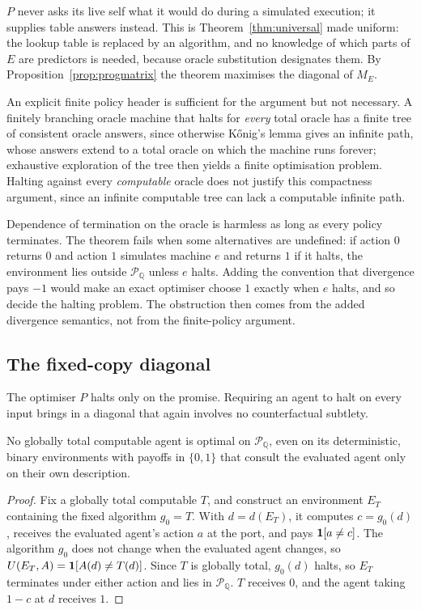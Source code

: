 $P$ never asks its live self what it would do during a simulated execution; it supplies table
answers instead. This is Theorem~\ref{thm:universal} made uniform: the lookup table is replaced by
an algorithm, and no knowledge of which parts of $E$ are predictors is needed, because oracle
substitution designates them. By Proposition~\ref{prop:progmatrix} the theorem maximises the
diagonal of $M_E$.

An explicit finite policy header is sufficient for the argument but not necessary. A finitely
branching oracle machine that halts for \emph{every} total oracle has a finite tree of consistent
oracle answers, since otherwise Kőnig's lemma \autocite{konig1927} gives an infinite path, whose
answers extend to a total oracle on which the machine runs forever; exhaustive exploration of the
tree then yields a finite optimisation problem. Halting against every \emph{computable} oracle does
not justify this compactness argument, since an infinite computable tree can lack a computable
infinite path.

Dependence of termination on the oracle is harmless as long as every policy terminates. The theorem
fails when some alternatives are undefined: if action $0$ returns $0$ and action $1$ simulates
machine $e$ and returns $1$ if it halts, the environment lies outside $\mathcal P_{\mathbb Q}$ unless
$e$ halts. Adding the convention that divergence pays $-1$ would make an exact optimiser choose $1$
exactly when $e$ halts, and so decide the halting problem. The obstruction then comes from the
added divergence semantics, not from the finite-policy argument.

\subsection{The fixed-copy diagonal}

The optimiser $P$ halts only on the promise. Requiring an agent to halt on every input brings in a
diagonal that again involves no counterfactual subtlety.

\begin{theorem}\label{thm:fixedcopy}
No globally total computable agent is optimal on $\mathcal P_{\mathbb Q}$, even on its deterministic,
binary environments with payoffs in $\{0,1\}$ that consult the evaluated agent only on their own
description.
\end{theorem}

\begin{proof}
Fix a globally total computable $T$, and construct an environment $E_T$ containing the fixed algorithm
$g_0=T$. With $d=d(E_T)$, it computes $c=g_0(d)$, receives the evaluated agent's action $a$ at the
port, and pays $\mathbf{1}[a\neq c]$. The algorithm $g_0$ does not change when the evaluated agent changes,
so $U(E_T,A)=\mathbf{1}[A(d)\ne T(d)]$. Since $T$ is globally total, $g_0(d)$ halts, so $E_T$ terminates
under either action and lies in $\mathcal P_{\mathbb Q}$. $T$ receives $0$, and the agent taking
$1-c$ at $d$ receives $1$.
\end{proof}

